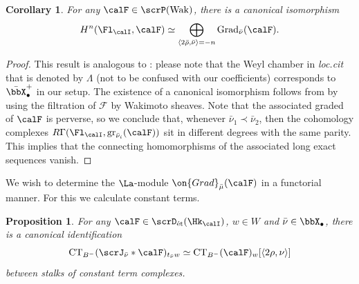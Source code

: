 \documentclass[10pt, reqno]{amsart}
\theoremstyle{plain}
\newtheorem{proposition}[theorem]{Proposition}
\newtheorem{corollary}[theorem]{Corollary}
\theoremstyle{definition}
\numberwithin{equation}{section}
\begin{document}
	\begin{corollary}\label{coro_Grad_composes_Zisom_H}
		For any $\calF\in\scrP(\mathrm{Wak})$, there is a canonical isomorphism
		\begin{equation}
			H^n(\Fl_\calI,\calF)\simeq \bigoplus_{\langle 2\bar\rho, \bar\nu\rangle=-n}\mathrm{Grad}_{\bar{\nu}}(\calF).
		\end{equation}
	\end{corollary}
	\begin{proof}
		This result is analogous to \cite[Proposition 4.5.4]{AR}: please note that the Weyl chamber in \textit{loc.cit} that is denoted by $\Lambda$ (not to be confused with our coefficients) corresponds to $\bar \bbX^+_\bullet$ in our setup. The existence of a canonical isomorphism follows from   by using the filtration of $\mathcal{F}$ by Wakimoto sheaves. Note that the associated graded of $\calF$ is perverse, so we conclude that, whenever $\bar\nu_1 \prec \bar \nu_2$, then the cohomology complexes $R\Gamma(\Fl_\calI, \mathrm{gr}_{\bar\nu_i}(\calF)) $ sit in different degrees with the same parity. This implies that the connecting homomorphisms of the associated long exact sequences vanish.
	\end{proof}
	
	We wish to determine the $\La$-module $\on{Grad}_{\bar{\mu}}(\calF)$ in a functorial manner. For this we calculate constant terms.
	
	
	\begin{proposition}\label{prop_wakimoto_constant_terms}
		For any $\calF\in \scrD_{\mathrm{\acute{e}t}}(\Hk_\calI)$, $w\in W$ and $\bar\nu\in \bbX_\bullet$, there is a canonical identification
		\begin{equation}\label{equation_weight_functor}
			\mathrm{CT}_{B^-}(\scrJ_{\bar \nu} \ast \calF)_{t_{\bar\nu}w} \simeq \mathrm{CT}_{B^-}(\calF)_w[\langle 2\rho, \nu \rangle]
		\end{equation}
		between stalks of constant term complexes. 
	\end{proposition}
	
\end{document}
